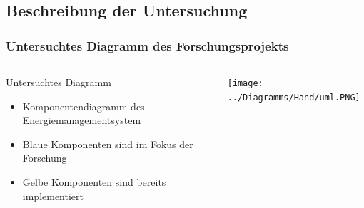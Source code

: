 \documentclass[xcolor=dvipsnames]{beamer}
\begin{document}
\begin{frame}
\begin{thebibliography}{00}
		\end{thebibliography}
	\end{frame}
	
	
	
	
	
	\begin{frame}
		\section{Beschreibung der Untersuchung}
		\frametitle{Untersuchtes Diagramm des Forschungsprojekts}
		\begin{columns}
			
			
			\begin{column}{0.35\textwidth}
				\begin{block}{Untersuchtes Diagramm}
					\begin{itemize}
						\item Komponentendiagramm des Energiemanagementsystem
						\item Blaue Komponenten sind im Fokus der Forschung
						\item Gelbe Komponenten sind bereits implementiert
					\end{itemize}
					
				\end{block}
			\end{column}
	
			\begin{column}{0.7\textwidth}
				\begin{minipage}{\textwidth}
					\texttt{[image: ../Diagramms/Hand/uml.PNG]}
				\end{minipage}
			\end{column}
			
				\end{columns}
	\end{frame}
	
	
	
\end{document}
